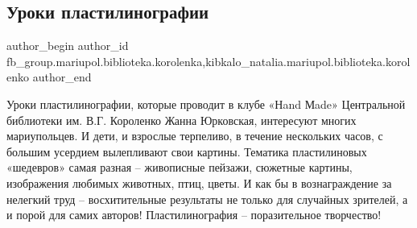  
 
 
 
 

\subsection{Уроки пластилинографии}
\label{sec:28_10_2018.fb.fb_group.mariupol.biblioteka.korolenka.1.uroki_plastilinograf}
 
\ifcmt
 author_begin
   author_id fb_group.mariupol.biblioteka.korolenka,kibkalo_natalia.mariupol.biblioteka.korolenko
 author_end
\fi

Уроки пластилинографии, которые проводит в клубе «Нand Мade» Центральной
библиотеки им. В.Г. Короленко Жанна Юрковская, интересуют многих мариупольцев.
И дети, и взрослые терпеливо, в течение нескольких часов, с большим усердием
вылепливают свои картины. Тематика пластилиновых «шедевров» самая разная –
живописные пейзажи, сюжетные картины, изображения любимых животных, птиц,
цветы. И как бы в вознаграждение за нелегкий труд – восхитительные результаты
не только для случайных зрителей, а и порой для самих авторов! Пластилинография
– поразительное творчество!

